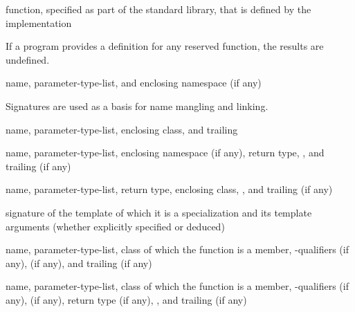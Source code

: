 %
function, specified as part of the \Cpp{} standard library, that is defined by the
implementation

\begin{defnote}
If a \Cpp{} program provides a definition for any reserved function, the results are undefined.%
\end{defnote}

%
name,
parameter-type-list,
and enclosing namespace (if any)

\begin{defnote}
Signatures are used as a basis for
name mangling and linking.
\end{defnote}

%
name,
parameter-type-list,
enclosing class,
and
trailing 

%
name,
parameter-type-list,
enclosing namespace (if any),
return type,
,
and
trailing  (if any)

%
name,
parameter-type-list,
return type,
enclosing class,
,
and
trailing  (if any)

%
 signature of the template of which it is a specialization
and its template arguments (whether explicitly specified or deduced)

%
name,
parameter-type-list,
class of which the function is a member,
\cv-qualifiers (if any),
 (if any),
and
trailing  (if any)

%
name,
parameter-type-list,
class of which the function is a member,
\cv-qualifiers (if any),
 (if any),
return type (if any),
,
and
trailing  (if any)

